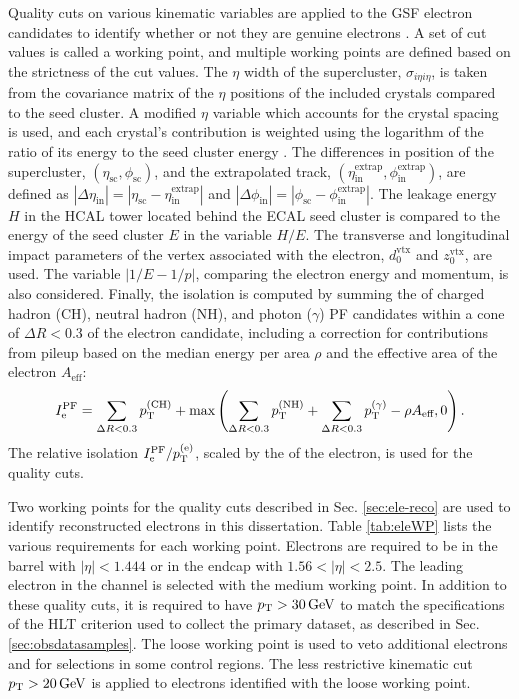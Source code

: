 Quality cuts on various kinematic variables are applied to the GSF electron candidates to identify whether or not they are genuine electrons \cite{ElectronCutBased}. A set of cut values is called a working point, and multiple working points are defined based on the strictness of the cut values. The $\eta$ width of the supercluster, $\sigma_{i\eta i\eta}$, is taken from the covariance matrix of the $\eta$ positions of the included crystals compared to the seed cluster. A modified $\eta$ variable which accounts for the crystal spacing is used, and each crystal's contribution is weighted using the logarithm of the ratio of its energy to the seed cluster energy \cite{EgammaShowerShape}. The differences in position of the supercluster, $(\eta_{\text{sc}},\phi_{\text{sc}})$, and the extrapolated track, $(\eta_{\text{in}}^{\text{extrap}},\phi_{\text{in}}^{\text{extrap}})$, are defined as $|\Delta \eta_{\text{in}}| = |\eta_{\text{sc}} - \eta_{\text{in}}^{\text{extrap}}|$ and $|\Delta \phi_{\text{in}}| = |\phi_{\text{sc}} - \phi_{\text{in}}^{\text{extrap}}|$. The leakage energy $H$ in the HCAL tower located behind the ECAL seed cluster is compared to the energy of the seed cluster $E$ in the variable $H/E$. The transverse and longitudinal impact parameters of the vertex associated with the electron, $d_{0}^{\text{vtx}}$ and $z_{0}^{\text{vtx}}$, are used. The variable $|1/E - 1/p|$, comparing the electron energy and momentum, is also considered. Finally, the isolation is computed by summing the \pt of charged hadron (CH), neutral hadron (NH), and photon ($\gamma$) PF candidates within a cone of $\Delta R < 0.3$ of the electron candidate, including a correction for contributions from pileup based on the median energy per area $\rho$ and the effective area of the electron $A_{\text{eff}}$:
\begin{equation}
I^{\text{PF}}_{\mathrm{e}} = \sum_{\Delta R < 0.3}{p_{\mathrm{T}}^{(\text{CH})}} + \text{max}\left( \sum_{\Delta R < 0.3}{p_{\mathrm{T}}^{(\text{NH})}} + \sum_{\Delta R < 0.3}{p_{\mathrm{T}}^{(\gamma)}} - \rho A_{\text{eff}}, 0 \right).
\end{equation}
The relative isolation $I^{\text{PF}}_{\mathrm{e}}/p_{\mathrm{T}}^{(\mathrm{e})}$, scaled by the \pt of the electron, is used for the quality cuts.

Two working points for the quality cuts described in Sec. \ref{sec:ele-reco} are used to identify reconstructed electrons in this dissertation. Table \ref{tab:eleWP} lists the various requirements for each working point. Electrons are required to be in the barrel with $|\eta|<1.444$ or in the endcap with $1.56<|\eta|<2.5$. The leading electron in the \etau channel is selected with the medium working point. In addition to these quality cuts, it is required to have $p_{\mathrm{T}}>30\,\text{Ge\hspace{-.08em}V}$ to match the specifications of the HLT criterion used to collect the primary dataset, as described in Sec. \ref{sec:obsdatasamples}. The loose working point is used to veto additional electrons and for selections in some control regions. The less restrictive kinematic cut $p_{\mathrm{T}}>20\,\text{Ge\hspace{-.08em}V}$ is applied to electrons identified with the loose working point.


